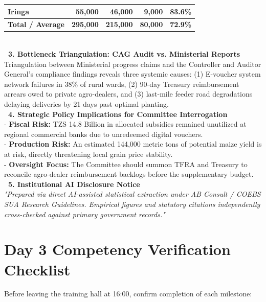 \documentclass[11pt, a4paper]{report}
\begin{document}
\begin{tcolorbox}[colback=lightgrey, colframe=bordergrey, title=\textbf{Deliverable 3 Preview: \texttt{Day3\_Sector\_Evidence\_Dossier.md}}]
\begin{tabular}{lrrrr}
Iringa & 55,000 & 46,000 & 9,000 & 83.6\% \\
\midrule
\textbf{Total / Average} & \textbf{295,000} & \textbf{215,000} & \textbf{80,000} & \textbf{72.9\%} \\
\bottomrule
\end{tabular}\\[0.2cm]
\textcolor{tanzaniablue}{\textbf{\ 3. Bottleneck Triangulation: CAG Audit vs. Ministerial Reports}}\\
Triangulation between Ministerial progress claims and the Controller and Auditor General's compliance findings reveals three systemic causes: (1) E-voucher system network failures in 38\% of rural wards, (2) 90-day Treasury reimbursement arrears owed to private agro-dealers, and (3) last-mile feeder road degradations delaying deliveries by 21 days past optimal planting.\\[0.2cm]
\textcolor{tanzaniablue}{\textbf{\ 4. Strategic Policy Implications for Committee Interrogation}}\\
- \textbf{Fiscal Risk:} TZS 14.8 Billion in allocated subsidies remained unutilized at regional commercial banks due to unredeemed digital vouchers.\\
- \textbf{Production Risk:} An estimated 144,000 metric tons of potential maize yield is at risk, directly threatening local grain price stability.\\
- \textbf{Oversight Focus:} The Committee should summon TFRA and Treasury to reconcile agro-dealer reimbursement backlogs before the supplementary budget.\\[0.2cm]
\textcolor{tanzaniablue}{\textbf{\ 5. Institutional AI Disclosure Notice}}\\
\textit{"Prepared via direct AI-assisted statistical extraction under AB Consult / COEBS SUA Research Guidelines. Empirical figures and statutory citations independently cross-checked against primary government records."}
\end{tcolorbox}

\section{Day 3 Competency Verification Checklist}
Before leaving the training hall at 16:00, confirm completion of each milestone:
\end{document}
